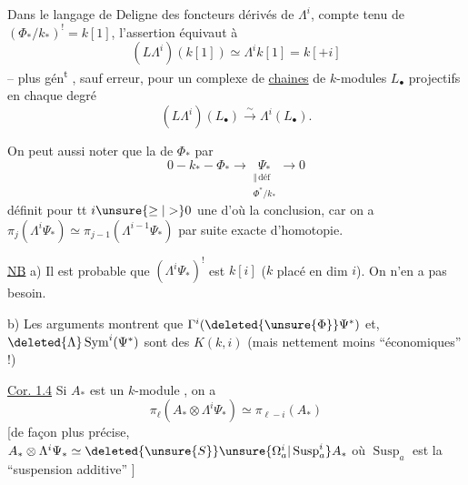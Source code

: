 Dans le langage de Deligne des foncteurs dérivés de $\Lambda^i$,
compte tenu de $(\Phi_*/k_*)^!=k[1]$, l'assertion équivaut à
\[
(L\Lambda^i)(k[1])\simeq\Lambda^i k[1]=k[+i]
\]
-- plus gén\textsuperscript{t} , sauf erreur, pour un complexe de \uline{chaines} de $k$-modules $L_\bullet$
projectifs en chaque degré
\[
(L\Lambda^i)(L_\bullet)\xrightarrow{\sim}\Lambda^i(L_\bullet).
\]

On peut aussi noter que la  de $\Phi_*$ par
\[
0\mathbin{-}k_*\mathbin{-}\Phi_*\longrightarrow
\underset{\substack{\Vert\,\mathrm{déf}\\\Phi^*/k_*}}{\Psi_*}\longrightarrow0
\]
définit pour tt $i\unsure{\geq|>}0$ une 
d'où la conclusion, car on a
$\pi_j(\Lambda^i\Psi_*)\simeq\pi_{j-1}(\Lambda^{i-1}\Psi_*)$
par suite exacte d'homotopie.

\uline{NB} a) Il est probable que $(\Lambda^i\Psi_*)^!$ est  $k[i]$
($k$ placé en dim $i$). On n'en a pas besoin.

b) Les  arguments montrent que
$\Gamma^i(\deleted{\unsure{\Phi}}\Psi^*)$ et, $\deleted{\Lambda}\operatorname{Sym}^i(\Psi^*)$
\inserted{$\otimes\Psi^*$} sont des $K(k,i)$
(mais nettement moins ``économiques'' !)

\uline{Cor. 1.4} Si $A_*$ est un $k$-module , on a
\[
\pi_\ell(A_*\otimes\Lambda^i\Psi_*)\simeq\pi_{\ell-i}(A_*)
\]
[de façon plus précise, 
$A_*\otimes\Lambda^i\Psi_*\simeq\deleted{\unsure{S}}\unsure{\Omega_a^i|\operatorname{Susp}_a^i}A_*$ \deleted{]}
où $\operatorname{Susp}_a$ est la ``suspension additive'' ]

